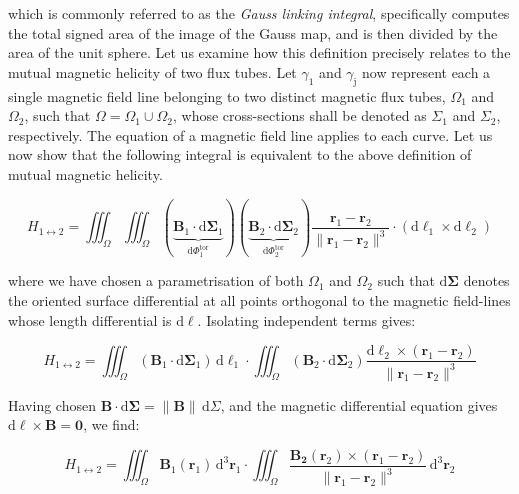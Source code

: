 which is commonly referred to as the \textit{Gauss linking integral}, specifically computes the total signed area of the image of the Gauss map, and is then divided by the area of the unit sphere. Let us examine how this definition precisely relates to the mutual magnetic helicity of two flux tubes. Let $\gamma_\text{1}$ and $\gamma_\text{j}$ now represent each a single magnetic field line belonging to two distinct magnetic flux tubes, $\Omega_1$ and $\Omega_2$, such that $\Omega=\Omega_1\cup\Omega_2$, whose cross-sections shall be denoted as $\Sigma_1$ and $\Sigma_2$, respectively. The equation of a magnetic field line applies to each curve. Let us now show that the following integral is equivalent to the above definition of mutual magnetic helicity.

\begin{equation}
    H_{1\leftrightarrow2}=\iiint_\Omega\iiint_\Omega(\underbrace{\mathbf{B}_1\cdot\mathrm{d}\boldsymbol{\Sigma}_1}_{\mathrm{d}\Phi_1^\text{tor}})(\underbrace{\mathbf{B}_2\cdot\mathrm{d}\boldsymbol{\Sigma}_2}_{\mathrm{d}\Phi_2^\text{tor}})\frac{\mathbf{r}_1-\mathbf{r}_2}{\|\mathbf{r}_1-\mathbf{r}_2\|^3}\cdot\left(\mathrm{d}\boldsymbol{\ell}_1\times\mathrm{d}\boldsymbol{\ell}_2\right)
\end{equation}

where we have chosen a parametrisation of both $\Omega_1$ and $\Omega_2$ such that $\mathrm{d}\boldsymbol{\Sigma}$ denotes the oriented surface differential at all points orthogonal to the magnetic field-lines whose length differential is $\mathrm{d}\boldsymbol{\ell}$. Isolating independent terms gives:

\begin{equation}
    H_{1\leftrightarrow2}=\iiint_\Omega(\mathbf{B}_1\cdot\mathrm{d}\boldsymbol{\Sigma}_1)\,\mathrm{d}\boldsymbol{\ell}_1\cdot\iiint_\Omega(\mathbf{B}_2\cdot\mathrm{d}\boldsymbol{\Sigma}_2)\frac{\mathrm{d}\boldsymbol{\ell}_2\times(\mathbf{r}_1-\mathbf{r}_2)}{\|\mathbf{r}_1-\mathbf{r}_2\|^3}
\end{equation}

Having chosen $\mathbf{B}\cdot\mathrm{d}\boldsymbol{\Sigma}=\|\mathbf{B}\|\,\mathrm{d}\Sigma$, and the magnetic differential equation gives $\mathrm{d}\boldsymbol{\ell}\times\mathbf{B}=\mathbf{0}$, we find:

\begin{equation}
    H_{1\leftrightarrow2}=\iiint_\Omega\mathbf{B}_1(\mathbf{r}_1)\,\mathrm{d}^3\mathbf{r}_1\cdot\iiint_\Omega\frac{\mathbf{B_2}(\mathbf{r}_2)\times(\mathbf{r}_1-\mathbf{r}_2)}{\|\mathbf{r}_1-\mathbf{r}_2\|^3}\,\mathrm{d}^3\mathbf{r}_2
\end{equation}

